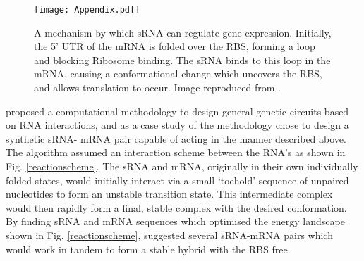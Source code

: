 \documentclass[10pt,journal]{./IEEE_latex_class/IEEEtran}
\begin{document}
\begin{figure}[h]
\centering
\texttt{[image: Appendix.pdf]}
\caption{A mechanism by which sRNA can regulate gene expression. Initially, the 5' UTR of the mRNA is folded over the RBS, forming a loop and blocking Ribosome binding. The sRNA binds to this loop in the mRNA, causing a conformational change which uncovers the RBS, and allows translation to occur. Image reproduced from \cite{Rodrigo2012}.}
\label{RBS}
\end{figure}


\cite{Rodrigo2012} proposed a computational methodology to design general genetic circuits based on RNA interactions, and as a case study of the methodology chose to design a synthetic sRNA- mRNA pair capable of acting in the manner described above. The algorithm assumed an interaction scheme between the RNA's as shown in Fig. \ref{reactionscheme}. The sRNA and mRNA, originally in their own individually folded states, would initially interact via a small 
`toehold' sequence of unpaired nucleotides to form an unstable transition state. This intermediate complex would then rapidly form a final, stable complex with the desired conformation. By finding sRNA and mRNA sequences which optimised the energy landscape shown in Fig. \ref{reactionscheme}, \cite{Rodrigo2012} suggested several sRNA-mRNA pairs which would work in tandem to form a stable hybrid with the RBS free. 
\end{document}

